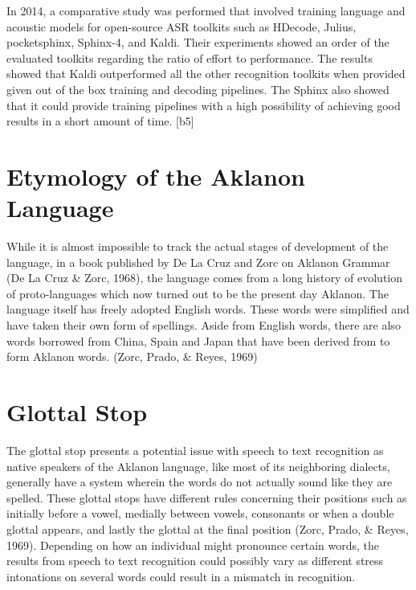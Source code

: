 In 2014, a comparative study was performed that involved training language and acoustic models for open-source ASR toolkits such as HDecode, Julius, pocketsphinx, Sphinx-4, and Kaldi. Their experiments showed an order of the evaluated toolkits regarding the ratio of effort to performance. The results showed that Kaldi outperformed all the other recognition toolkits when provided given out of the box training and decoding pipelines. The Sphinx also showed that it could provide training pipelines with a high possibility of achieving good results in a short amount of time.  [b5]


\section{Etymology of the Aklanon Language}

While it is almost impossible to track the actual stages of development of the language, in a book published by De La Cruz and Zorc on Aklanon Grammar (De La Cruz & Zorc, 1968), the language comes from a long history of evolution of proto-languages which now turned out to be the present day Aklanon. The language itself has freely adopted English words. These words were simplified and have taken their own form of spellings. Aside from English words, there are also words borrowed from China, Spain and Japan that have been derived from to form Aklanon words. (Zorc, Prado, \& Reyes, 1969)

\section{Glottal Stop}

The glottal stop presents a potential issue with speech to text recognition as native speakers of the Aklanon language, like most of its neighboring dialects, generally have a system wherein the words do not actually sound like they are spelled. These glottal stops have different rules concerning their positions such as initially before a vowel, medially between vowels, consonants or when a double glottal appears, and lastly the glottal at the final position (Zorc, Prado, \& Reyes, 1969). Depending on how an individual might pronounce certain words, the results from speech to text recognition could possibly vary as different stress intonations on several words could result in a mismatch in recognition.
